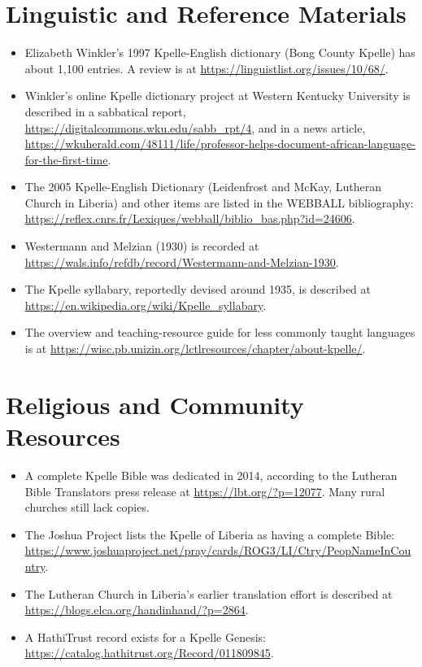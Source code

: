\documentclass[12pt]{article}
\begin{document}
\section{Linguistic and Reference Materials}
\begin{itemize}
\item Elizabeth Winkler's 1997 Kpelle-English dictionary (Bong County Kpelle) has about 1,100 entries. A review is at \url{https://linguistlist.org/issues/10/68/}.
\item Winkler's online Kpelle dictionary project at Western Kentucky University is described in a sabbatical report, \url{https://digitalcommons.wku.edu/sabb_rpt/4}, and in a news article, \url{https://wkuherald.com/48111/life/professor-helps-document-african-language-for-the-first-time}.
\item The 2005 Kpelle-English Dictionary (Leidenfrost and McKay, Lutheran Church in Liberia) and other items are listed in the WEBBALL bibliography: \url{https://reflex.cnrs.fr/Lexiques/webball/biblio_bas.php?id=24606}.
\item Westermann and Melzian (1930) is recorded at \url{https://wals.info/refdb/record/Westermann-and-Melzian-1930}.
\item The Kpelle syllabary, reportedly devised around 1935, is described at \url{https://en.wikipedia.org/wiki/Kpelle_syllabary}.
\item The overview and teaching-resource guide for less commonly taught languages is at \url{https://wisc.pb.unizin.org/lctlresources/chapter/about-kpelle/}.
\end{itemize}

\section{Religious and Community Resources}
\begin{itemize}
\item A complete Kpelle Bible was dedicated in 2014, according to the Lutheran Bible Translators press release at \url{https://lbt.org/?p=12077}. Many rural churches still lack copies.
\item The Joshua Project lists the Kpelle of Liberia as having a complete Bible: \url{https://www.joshuaproject.net/pray/cards/ROG3/LI/Ctry/PeopNameInCountry}.
\item The Lutheran Church in Liberia's earlier translation effort is described at \url{https://blogs.elca.org/handinhand/?p=2864}.
\item A HathiTrust record exists for a Kpelle Genesis: \url{https://catalog.hathitrust.org/Record/011809845}.
\end{itemize}
\end{document}
